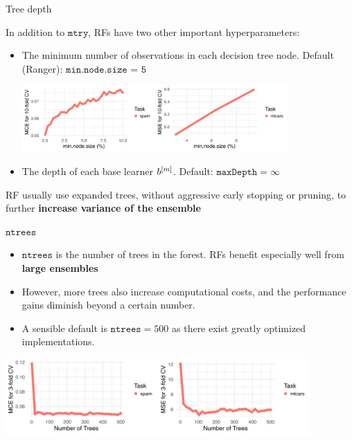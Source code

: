 \documentclass[11pt,compress,t,notes=noshow, xcolor=table]{beamer}
\begin{document}
\begin{vbframe}{Tree depth}

In addition to $\texttt{mtry}$, RFs have two other important hyperparameters:

\begin{itemize}
  \item The minimum number of observations in each decision tree node. Default (Ranger): $\texttt{min.node.size = 5}$ 
\begin{center}
\includegraphics[width=0.8\textwidth]{figure/forest-minnode.png}
\end{center}
  \item The depth of each base learner $b^{[m]}$. Default: $\texttt{maxDepth} = \infty$
\end{itemize}

RF usually use expanded trees, without aggressive early stopping or pruning, to further \textbf{increase variance of the ensemble} 
\end{vbframe}

\begin{vbframe}{$\texttt{ntrees}$}
\begin{itemize}
\item $\texttt{ntrees}$ is the number of trees in the forest. RFs benefit especially well from \textbf{large ensembles} 
\item However, more trees also increase computational costs, and the performance gains diminish beyond a certain number.
\item A sensible default is $\texttt{ntrees} = 500$ as there exist greatly optimized implementations.
\end{itemize}

\begin{center}
\includegraphics[width=330pt]{figure/forest-ntree.png}
\end{center}
\end{vbframe}
\end{document}
